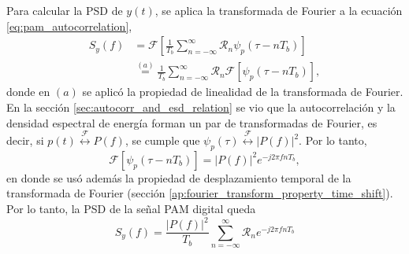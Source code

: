 \documentclass[a4paper]{article}
\begin{document}
Para calcular la PSD de \(y(t)\), se aplica la transformada de Fourier a la ecuación \ref{eq:pam_autocorrelation},
\begin{align*}
 S_y(f)&=\mathcal{F}\left[\frac{1}{T_b}\sum_{n=-\infty}^{\infty}\mathcal{R}_n\psi_p(\tau-nT_b)\right]\\
   &\overset{(a)}{=}\frac{1}{T_b}\sum_{n=-\infty}^{\infty}\mathcal{R}_n\mathcal{F}\left[\psi_p(\tau-nT_b)\right],
\end{align*}
donde en \((a)\) se aplicó la propiedad de linealidad de la transformada de Fourier. En la sección \ref{sec:autocorr_and_esd_relation} se vio que la autocorrelación y la densidad espectral de energía forman un par de transformadas de Fourier, es decir, si \(p(t)\overset{\mathcal{F}}{\longleftrightarrow}P(f)\), se cumple que 
\(\psi_p(\tau)\overset{\mathcal{F}}{\longleftrightarrow}|P(f)|^2\). Por lo tanto,
\[
 \mathcal{F}\left[\psi_p(\tau-nT_b)\right]=|P(f)|^2e^{-j2\pi fnT_b},
\]
en donde se usó además la propiedad de desplazamiento temporal de la transformada de Fourier (sección \ref{ap:fourier_transform_property_time_shift}). Por lo tanto, la PSD de la señal PAM digital queda
\begin{equation}\label{eq:pam_psd1}
  S_y(f)=\frac{|P(f)|^2}{T_b}\sum_{n=-\infty}^{\infty}\mathcal{R}_ne^{-j2\pi fnT_b}
\end{equation}
\end{document}
